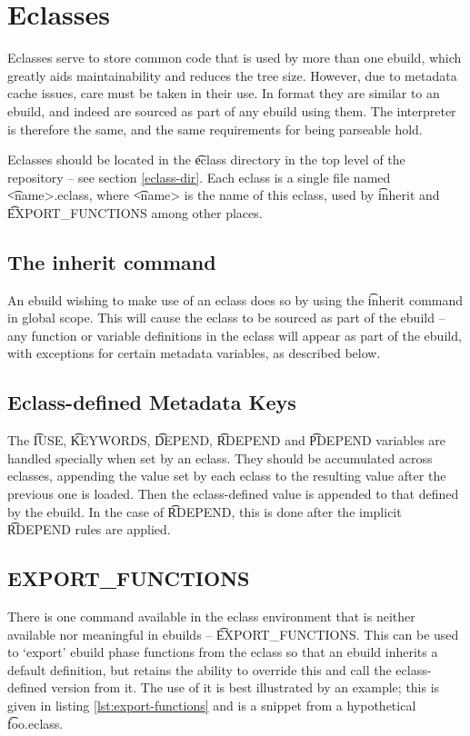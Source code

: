 \chapter{Eclasses}
\label{eclasses}

Eclasses serve to store common code that is used by more than one ebuild, which greatly aids
maintainability and reduces the tree size. However, due to metadata cache issues, care must be taken
in their use. In format they are similar to an ebuild, and indeed are sourced as part of any ebuild
using them. The interpreter is therefore the same, and the same requirements for being parseable
hold.

Eclasses should be located in the \t{eclass} directory in the top level of the repository -- see
section \ref{eclass-dir}. Each eclass is a single file named \t{<name>.eclass}, where \t{<name>} is
the name of this eclass, used by \t{inherit} and \t{EXPORT\_FUNCTIONS} among other places.

\section{The inherit command}

An ebuild wishing to make use of an eclass does so by using the \t{inherit} command in global scope.
This will cause the eclass to be sourced as part of the ebuild -- any function or variable
definitions in the eclass will appear as part of the ebuild, with exceptions for certain metadata
variables, as described below.

\section{Eclass-defined Metadata Keys}

The \t{IUSE}, \t{KEYWORDS}, \t{DEPEND}, \t{RDEPEND} and \t{PDEPEND} variables are handled specially
when set by an eclass. They should be accumulated across eclasses, appending the value set by each
eclass to the resulting value after the previous one is loaded. Then the eclass-defined value is
appended to that defined by the ebuild. In the case of \t{RDEPEND}, this is done after the
implicit \t{RDEPEND} rules are applied.

\section{EXPORT\_FUNCTIONS}

There is one command available in the eclass environment that is neither available nor meaningful
in ebuilds -- \t{EXPORT\_FUNCTIONS}. This can be used to `export' ebuild phase functions from the
eclass so that an ebuild inherits a default definition, but retains the ability to override this and
call the eclass-defined version from it. The use of it is best illustrated by an example; this is
given in listing \ref{lst:export-functions} and is a snippet from a hypothetical \t{foo.eclass}.

